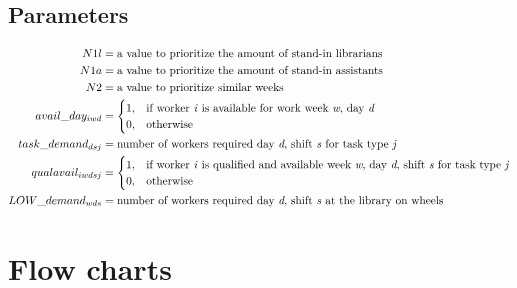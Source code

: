 \documentclass[a4paper, 10pt, twoside, openright]{book}
\begin{document}
\section{Parameters} \label{params}
\begin{align}
	N1l&= \text{a value to prioritize the amount of stand-in librarians}
	\\
	N1a&= \text{a value to prioritize the amount of stand-in assistants}
	\\
	N2&= \text{a value to prioritize similar weeks}
	\\
	avail\_day_{iwd}&=
	\begin{cases}
		1, & \text{if worker \textit{i} is available for work week \textit{w}, day \textit{d}} \\
		0, & \text{otherwise}
	\end{cases}
	\\
	task\_demand_{dsj}&= \text{number of workers required day \textit{d}, shift \textit{s} for task type \textit{j}}
	\\
	qualavail_{iwdsj}&=
	\begin{cases}
		1, & \text{if worker \textit{i} is qualified and available week \textit{w}, day \textit{d}, shift \textit{s} for task type \textit{j}} \\
		0, & \text{otherwise}
	\end{cases}
	\\
	LOW\_demand_{wds}&= \text{number of workers required day \textit{d}, shift \textit{s} at the library on wheels}
\end{align}

\chapter{Flow charts} \label{appendix:flow_charts}
\end{document}
